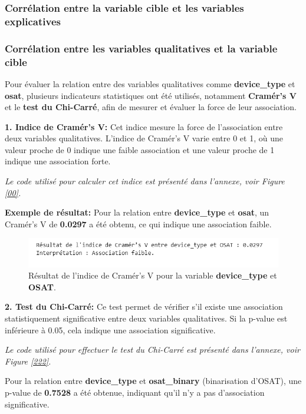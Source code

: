 \subsubsection{Corrélation entre la variable cible et les variables explicatives}
\subsubsection*{Corrélation entre les variables qualitatives et la variable cible}

Pour évaluer la relation entre des variables qualitatives comme \textbf{device\_type} et \textbf{osat}, plusieurs indicateurs statistiques ont été utilisés, notamment \textbf{Cramér's V} et le \textbf{test du Chi-Carré}, afin de mesurer et évaluer la force de leur association.

\textbf{1. Indice de Cramér’s V:} Cet indice mesure la force de l'association entre deux variables qualitatives. L'indice de Cramér’s V varie entre 0 et 1, où une valeur proche de 0 indique une faible association et une valeur proche de 1 indique une association forte.

\textit{Le code utilisé pour calculer cet indice est présenté dans l'annexe, voir Figure \ref{00}.}

\textbf{\checkmark Exemple de résultat:} Pour la relation entre \textbf{device\_type} et \textbf{osat}, un Cramér's V de \textbf{0.0297} a été obtenu, ce qui indique une association faible.

\begin{figure}[H]
    \centering
    \includegraphics[width=0.6\linewidth]{capture_sas_38.png}
    \caption{Résultat de l'indice de Cramér's V pour la variable \textbf{device\_type} et \textbf{OSAT}.}
\end{figure}
    
\textbf{2. Test du Chi-Carré:} Ce test permet de vérifier s'il existe une association statistiquement significative entre deux variables qualitatives. Si la p-value est inférieure à 0.05, cela indique une association significative.

\textit{Le code utilisé pour effectuer le test du Chi-Carré est présenté dans l'annexe, voir Figure \ref{222}.}

Pour la relation entre \textbf{device\_type} et \textbf{osat\_binary} (binarisation d'OSAT), une p-value de \textbf{0.7528} a été obtenue, indiquant qu'il n'y a pas d'association significative.

